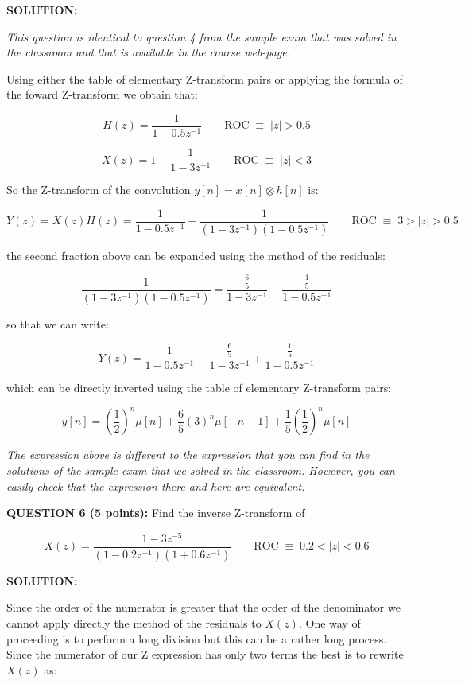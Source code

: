 \documentclass[a4paper,11pt,oneside]{article}
\begin{document}
\textbf{SOLUTION:}

\emph{This question is identical to question 4 from the sample exam that was solved in the classroom and that is available in the course web-page.}

Using either the table of elementary Z-transform pairs or applying the formula of the foward Z-transform we obtain that:

\[
H(z) = \frac{1}{1-0.5z^{-1}} \qquad \textrm{ROC} \;\equiv\; |z|>0.5
\]

\[
X(z) = 1 - \frac{1}{1-3z^{-1}} \qquad \textrm{ROC} \;\equiv\; |z|<3
\]

So the Z-transform of the convolution $y[n]=x[n]\otimes h[n]$ is:

\[
Y(z)=X(z)H(z)=\frac{1}{1-0.5z^{-1}}-\frac{1}{(1-3z^{-1})(1-0.5z^{-1})} \qquad \textrm{ROC} \;\equiv\; 3>|z|>0.5
\]

the second fraction above can be expanded using the method of the residuals:

\[
\frac{1}{(1-3z^{-1})(1-0.5z^{-1})}=\frac{\frac{6}{5}}{1-3z^{-1}}-\frac{\frac{1}{5}}{1-0.5z^{-1}}
\]

so that we can write:

\[
Y(z)=\frac{1}{1-0.5z^{-1}}-\frac{\frac{6}{5}}{1-3z^{-1}}+\frac{\frac{1}{5}}{1-0.5z^{-1}}
\]

which can be directly inverted using the table of elementary Z-transform pairs:

\[
y[n] = \left(\frac{1}{2}\right)^{n}\mu[n]+\frac{6}{5}\left(3\right)^{n}\mu[-n-1]+\frac{1}{5}\left(\frac{1}{2}\right)^n\mu[n]
\]


\emph{The expression above is different to the expression that you can find in the solutions of the sample exam that we solved in the classroom. However, you can easily check that the expression there and here are equivalent.}

\vspace{1cm}

\textbf{QUESTION 6 (5 points):} Find the inverse Z-transform of

\[
X(z) = \frac{1-3z^{-5}}{(1-0.2z^{-1})(1+0.6z^{-1})} \qquad \textrm{ROC}\;\equiv\; 0.2<|z|<0.6
\]

\vspace{1cm}

\textbf{SOLUTION:}

Since the order of the numerator is greater that the order of the denominator we cannot apply directly the method of the residuals to $X(z)$. One way of proceeding is to perform a long division but this can be a rather long process. Since the numerator of our Z expression has only two terms the best is to rewrite $X(z)$ as:
\end{document}
